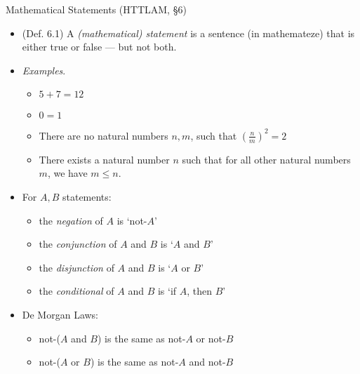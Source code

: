 \begin{frame}{Mathematical Statements (HTTLAM, \S6)}

	\begin{itemize}
	
		\item (Def. 6.1) A \emph{(mathematical) statement} is a sentence (in mathemateze) that is either true or false --- but not both.
		
		\item \emph{Examples}.
		
			\begin{itemize}
			
				\item $5+7=12$
				
				\item $0=1$
				
				\item There are no natural numbers $n,m$, such that $(\frac{n}{m})^2=2$
				
				
				\item There exists a natural number $n$ such that for all other natural numbers $m$, we have $m\leq n$.
			
			\end{itemize}
			
			\item For $A,B$ statements:
			
				\begin{itemize}
				
					\item the \emph{negation} of $A$ is  `not-$A$'
					
					\item the \emph{conjunction} of $A$ and $B$ is `$A$ and $B$'
					
					\item the \emph{disjunction} of $A$ and $B$ is `$A$ or $B$'
					
					\item the \emph{conditional} of $A$ and $B$ is `if $A$, then $B$'
				
				\end{itemize}
				
			\item De Morgan Laws:
			
				\begin{itemize}
				
					\item not-($A$ and $B$) is the same as not-$A$ or not-$B$
					\item not-($A$ or $B$) is the same as not-$A$ and not-$B$
				
				\end{itemize}
	
	\end{itemize}


\end{frame}

